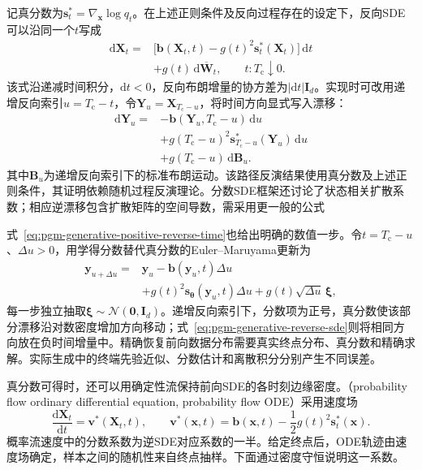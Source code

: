 记真分数为$\bm{s}_t^*=\nabla_{\bm{x}}\log q_t$。在上述正则条件及反向过程存在的设定下，反向SDE可以沿同一个$t$写成
\begin{equation}
  \label{eq:pgm-generative-reverse-sde}
  \begin{aligned}
    \mathrm{d}\bm{X}_t
    ={}&\bigl[\bm{b}(\bm{X}_t,t)-g(t)^2\bm{s}_t^*(\bm{X}_t)\bigr]
         \,\mathrm{d}t\\
       &+g(t)\,\mathrm{d}\overline{\bm{W}}_t,
    \qquad t:T_{\mathrm{c}}\downarrow0.
  \end{aligned}
\end{equation}
该式沿递减时间积分，$\mathrm{d}t<0$，反向布朗增量的协方差为$|\mathrm{d}t|\bm{I}_d$。实现时可改用递增反向索引$u=T_{\mathrm{c}}-t$，令$\bm{Y}_u=\bm{X}_{T_{\mathrm{c}}-u}$，将时间方向显式写入漂移：
\begin{equation}
  \label{eq:pgm-generative-positive-reverse-time}
  \begin{aligned}
    \mathrm{d}\bm{Y}_u
      ={}&-\bm{b}(\bm{Y}_u,T_{\mathrm{c}}-u)\,\mathrm{d}u\\
         &+g(T_{\mathrm{c}}-u)^2
              \bm{s}_{T_{\mathrm{c}}-u}^*(\bm{Y}_u)\,\mathrm{d}u\\
         &+g(T_{\mathrm{c}}-u)\,\mathrm{d}\bm{B}_u.
  \end{aligned}
\end{equation}
其中$\bm{B}_u$为递增反向索引下的标准布朗运动。该路径反演结果使用真分数及上述正则条件，其证明依赖随机过程反演理论。分数SDE框架还讨论了状态相关扩散系数；相应逆漂移包含扩散矩阵的空间导数，需采用更一般的公式

式~\eqref{eq:pgm-generative-positive-reverse-time}也给出明确的数值一步。令$t=T_{\mathrm{c}}-u$、$\Delta u>0$，用学得分数替代真分数的Euler--Maruyama更新为
\[
  \begin{aligned}
    \bm{y}_{u+\Delta u}
      ={}&\bm{y}_u-\bm{b}(\bm{y}_u,t)\Delta u\\
         &+g(t)^2\bm{s}_{\bm{\theta}}(\bm{y}_u,t)\Delta u
          +g(t)\sqrt{\Delta u}\,\bm{\xi},
  \end{aligned}
\]
每一步独立抽取$\bm{\xi}\sim\mathcal{N}(\bm{0},\bm{I}_d)$。递增反向索引下，分数项为正号，真分数使该部分漂移沿对数密度增加方向移动；式~\eqref{eq:pgm-generative-reverse-sde}则将相同方向放在负时间增量中。精确恢复前向数据分布需要真实终点分布、真分数和精确求解。实际生成中的终端先验近似、分数估计和离散积分分别产生不同误差。

真分数可得时，还可以用确定性流保持前向SDE的各时刻边缘密度。（probability flow ordinary differential equation, probability flow ODE）采用速度场
\begin{equation}
  \label{eq:pgm-generative-probability-flow}
  \frac{\mathrm{d}\bm{X}_t}{\mathrm{d}t}
     =\bm{v}^*(\bm{X}_t,t),
  \qquad
  \bm{v}^*(\bm{x},t)
     =\bm{b}(\bm{x},t)-\frac12g(t)^2\bm{s}_t^*(\bm{x}).
\end{equation}
概率流速度中的分数系数为逆SDE对应系数的一半。给定终点后，ODE轨迹由速度场确定，样本之间的随机性来自终点抽样。下面通过密度守恒说明这一系数。

